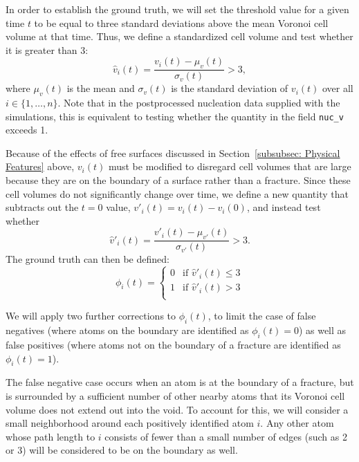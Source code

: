 In order to establish the ground truth, we will set the threshold value for a given time $t$ to be equal to three standard deviations above the mean Voronoi cell volume at that time.  Thus, we define a standardized cell volume and test whether it is greater than 3:
    \begin{equation}
    \hat{v}_i(t) = \frac{v_i(t) - \mu_v(t)}{\sigma_v(t)} > 3,
    \end{equation}
where $\mu_v(t)$ is the mean and $\sigma_v(t)$ is the standard deviation of $v_i(t)$ over all $i\in\{1,\dots,n\}$.  Note that in the postprocessed nucleation data supplied with the simulations, this is equivalent to testing whether the quantity in the field {\tt nuc\_v} exceeds 1.

Because of the effects of free surfaces discussed in Section~\ref{subsubsec: Physical Features} above, $v_i(t)$ must be modified to disregard cell volumes that are large because they are on the boundary of a surface rather than a fracture.  Since these cell volumes do not significantly change over time, we define a new quantity that subtracts out the $t=0$ value, $v'_i(t) = v_i(t)-v_i(0)$, and instead test whether
\begin{equation}
    \label{eqn: cell volume}
    \hat{v}'_i(t) = \frac{v'_i(t) - \mu_{v'}(t)}{\sigma_{v'}(t)} > 3.
\end{equation}
The ground truth can then be defined:
\begin{equation}
    \label{eqn: ground truth}
    \phi_i(t) = \begin{cases}
      0 & \text{if }\hat{v}'_i(t) \le 3 \\
      1 & \text{if }\hat{v}'_i(t) > 3 \\
    \end{cases} 
\end{equation}

We will apply two further corrections to $\phi_i(t)$, to limit the case of false negatives (where atoms on the boundary are identified as $\phi_i(t)=0$) as well as false positives (where atoms not on the boundary of a fracture are identified as $\phi_i(t)=1$).

The false negative case occurs when an atom is at the boundary of a fracture, but is surrounded by a sufficient number of other nearby atoms that its Voronoi cell volume does not extend out into the void.  To account for this, we will consider a small neighborhood around each positively identified atom $i$.  Any other atom whose path length to $i$ consists of fewer than a small number of edges (such as 2 or 3) will be considered to be on the boundary as well.

